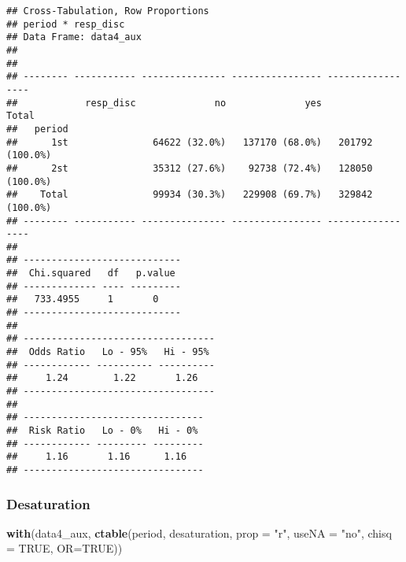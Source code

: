 \documentclass[
]{article}
\newenvironment{Shaded}{\begin{snugshade}}{\end{snugshade}}
\newcommand{\DataTypeTok}[1]{\textcolor[rgb]{0.13,0.29,0.53}{#1}}
\newcommand{\KeywordTok}[1]{\textcolor[rgb]{0.13,0.29,0.53}{\textbf{#1}}}
\newcommand{\NormalTok}[1]{#1}
\newcommand{\OtherTok}[1]{\textcolor[rgb]{0.56,0.35,0.01}{#1}}
\newcommand{\StringTok}[1]{\textcolor[rgb]{0.31,0.60,0.02}{#1}}
\begin{document}
\begin{verbatim}
## Cross-Tabulation, Row Proportions  
## period * resp_disc  
## Data Frame: data4_aux  
## 
## 
## -------- ----------- --------------- ---------------- -----------------
##            resp_disc              no              yes             Total
##   period                                                               
##      1st               64622 (32.0%)   137170 (68.0%)   201792 (100.0%)
##      2st               35312 (27.6%)    92738 (72.4%)   128050 (100.0%)
##    Total               99934 (30.3%)   229908 (69.7%)   329842 (100.0%)
## -------- ----------- --------------- ---------------- -----------------
## 
## ----------------------------
##  Chi.squared   df   p.value 
## ------------- ---- ---------
##   733.4955     1       0    
## ----------------------------
## 
## ----------------------------------
##  Odds Ratio   Lo - 95%   Hi - 95% 
## ------------ ---------- ----------
##     1.24        1.22       1.26   
## ----------------------------------
## 
## --------------------------------
##  Risk Ratio   Lo - 0%   Hi - 0% 
## ------------ --------- ---------
##     1.16       1.16      1.16   
## --------------------------------
\end{verbatim}

\hypertarget{desaturation}{%
\subsubsection{Desaturation}\label{desaturation}}

\begin{Shaded}
\begin{Highlighting}[]
\KeywordTok{with}\NormalTok{(data4_aux, }\KeywordTok{ctable}\NormalTok{(period, desaturation, }\DataTypeTok{prop =} \StringTok{"r"}\NormalTok{, }\DataTypeTok{useNA =} \StringTok{"no"}\NormalTok{, }\DataTypeTok{chisq =} \OtherTok{TRUE}\NormalTok{, }\DataTypeTok{OR=}\OtherTok{TRUE}\NormalTok{))}
\end{Highlighting}
\end{Shaded}
\end{document}
